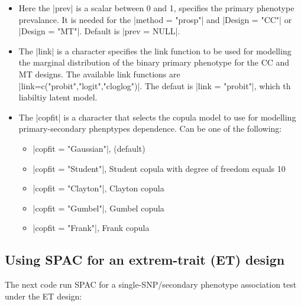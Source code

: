 \documentclass{article}\usepackage[]{graphicx}\usepackage[]{color}
\begin{document}
\begin{itemize}
\item Here the |prev| is a scalar between 0 and 1, specifies the primary phenotype prevalance.
It is needed for the |method = "prosp"| and |Design = "CC"| or |Design = "MT"|. Default is |prev = NULL|.


\item The |link| is a character specifies the link function to be used for modelling the marginal distribution of the binary primary phenotype for the CC and MT designs. The available link functions are |link=c("probit","logit","cloglog")|. The defaut is |link = "probit"|, which th liabiltiy latent model.

\item The |copfit| is a character that selects the copula model to use for modelling primary-secondary phenptypes dependence. Can be one of the following:
\begin{itemize}
\item |copfit = "Gaussian"|, (default)
\item |copfit = "Student"|, Student copula with degree of freedom equals 10
\item |copfit = "Clayton"|, Clayton copula
\item |copfit = "Gumbel"|, Gumbel copula
\item |copfit = "Frank"|, Frank copula
\end{itemize}
\end{itemize}

\subsection{Using SPAC for an extrem-trait (ET) design}
\label{sec:using-SPAC-ET}
The next code run SPAC for a single-SNP/secondary phenotype association test under the ET design:
\end{document}
